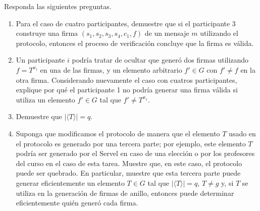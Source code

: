 
Responda las siguientes preguntas.
\begin{enumerate}
\item \text{[0.5 puntos]} Para el caso de cuatro participantes, demuestre que si el participante 3 construye una firma
$(s_1, s_2, s_3, s_4, c_1, f)$ de un mensaje $m$ utilizando el protocolo, entonces el proceso
de verificación concluye que la firma es válida.

\item \text{[0.5 puntos]} Un participante $i$ podría tratar de ocultar que generó dos firmas utilizando $f = T^{x_i}$ en una de las
firmas, y un elemento arbitrario $f' \in G$ con $f' \neq f$ en la otra firma. Considerando nuevamente el caso con cuatros
participantes, explique por qué el participante 1 no podría generar una firma válida si utiliza un elemento $f' \in G$
tal que $f' \neq T^{x_1}$.

\item \text{[0.5 puntos]} Demuestre que $|\langle T \rangle| = q$.

\item \text{[0.5 puntos]} Suponga que modificamos el protocolo de manera que el elemento $T$ usado en el protocolo es generado por
una tercera parte; por ejemplo, este elemento $T$ podría ser generado por el Servel en caso de una elección o por los
profesores del curso en el caso de esta tarea. Muestre que, en este caso, el protocolo puede ser quebrado. En particular,
muestre que esta tercera parte puede generar eficientemente un elemento $T \in G$ tal que $|\langle T \rangle| = q$, $T \neq g$
y, si $T$ se utiliza en la generación de firmas de anillo, entonces puede determinar eficientemente quién
generó cada firma.
\end{enumerate}

\medskip
